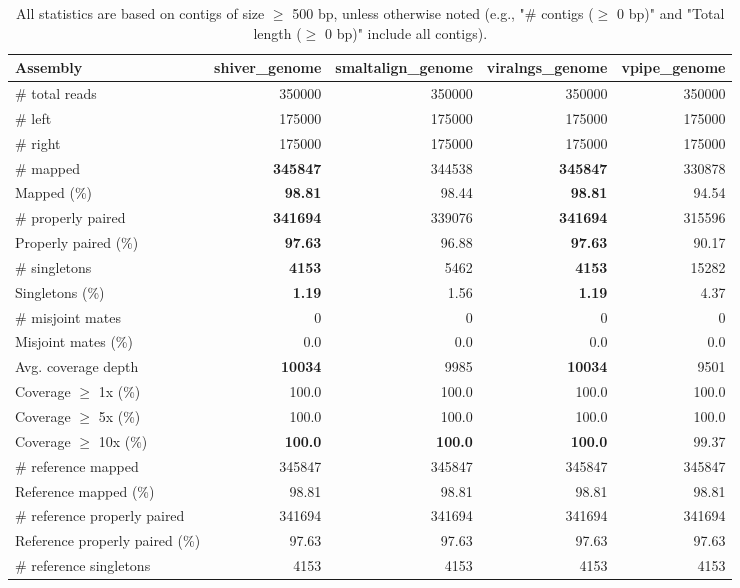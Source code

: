 \documentclass[12pt,a4paper]{article}
\begin{document}
\begin{table}[ht]
\begin{center}
\caption{All statistics are based on contigs of size $\geq$ 500 bp, unless otherwise noted (e.g., "\# contigs ($\geq$ 0 bp)" and "Total length ($\geq$ 0 bp)" include all contigs).}
\begin{tabular}{|l*{4}{|r}|}
\hline
Assembly & shiver\_genome & smaltalign\_genome & viralngs\_genome & vpipe\_genome \\ \hline
\# total reads & 350000 & 350000 & 350000 & 350000 \\ \hline
\# left & 175000 & 175000 & 175000 & 175000 \\ \hline
\# right & 175000 & 175000 & 175000 & 175000 \\ \hline
\# mapped & {\bf 345847} & 344538 & {\bf 345847} & 330878 \\ \hline
Mapped (\%) & {\bf 98.81} & 98.44 & {\bf 98.81} & 94.54 \\ \hline
\# properly paired & {\bf 341694} & 339076 & {\bf 341694} & 315596 \\ \hline
Properly paired (\%) & {\bf 97.63} & 96.88 & {\bf 97.63} & 90.17 \\ \hline
\# singletons & {\bf 4153} & 5462 & {\bf 4153} & 15282 \\ \hline
Singletons (\%) & {\bf 1.19} & 1.56 & {\bf 1.19} & 4.37 \\ \hline
\# misjoint mates & 0 & 0 & 0 & 0 \\ \hline
Misjoint mates (\%) & 0.0 & 0.0 & 0.0 & 0.0 \\ \hline
Avg. coverage depth & {\bf 10034} & 9985 & {\bf 10034} & 9501 \\ \hline
Coverage $\geq$ 1x (\%) & 100.0 & 100.0 & 100.0 & 100.0 \\ \hline
Coverage $\geq$ 5x (\%) & 100.0 & 100.0 & 100.0 & 100.0 \\ \hline
Coverage $\geq$ 10x (\%) & {\bf 100.0} & {\bf 100.0} & {\bf 100.0} & 99.37 \\ \hline
\# reference mapped & 345847 & 345847 & 345847 & 345847 \\ \hline
Reference mapped (\%) & 98.81 & 98.81 & 98.81 & 98.81 \\ \hline
\# reference properly paired & 341694 & 341694 & 341694 & 341694 \\ \hline
Reference properly paired (\%) & 97.63 & 97.63 & 97.63 & 97.63 \\ \hline
\# reference singletons & 4153 & 4153 & 4153 & 4153 \\ \hline

\end{tabular}
\end{center}
\end{table}
\end{document}
